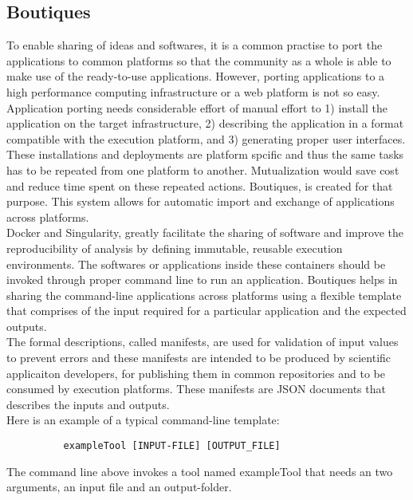 \subsection{Boutiques}
To enable sharing of ideas and softwares, it is a common practise to port the applications to common platforms so that the community as a whole is able to make use of the ready-to-use applications. However, porting applications to a high performance computing infrastructure or a web platform is not so easy. Application porting needs considerable effort of manual effort to 1) install the application on the target infrastructure, 2) describing the application in a format compatible with the execution platform, and 3) generating proper user interfaces. These installations and deployments are platform spcific and thus the same tasks has to be repeated from one platform to another. Mutualization would save cost and reduce time spent on these repeated actions. Boutiques, is created for that purpose. This system allows for automatic import and exchange of applications across platforms.\\

Docker and Singularity, greatly facilitate the sharing of software and improve the reproducibility of analysis by defining immutable, reusable execution environments. The softwares or applications inside these containers should be invoked through proper command line to run an application. Boutiques helps in sharing the command-line applications across platforms using a flexible template that comprises of the input required for a particular application and the expected outputs.\\

The formal descriptions, called manifests, are used for validation of input values to prevent errors and these manifests are intended to be produced by scientific applicaiton developers, for publishing them in common repositories and to be consumed by execution platforms. These manifests are JSON documents that describes the inputs and outputs.\\

Here is an example of a typical command-line template:

\begin{verbatim}
          exampleTool [INPUT-FILE] [OUTPUT_FILE]
\end{verbatim}

The command line above invokes a tool named exampleTool that needs an two arguments, an input file and an output-folder.

